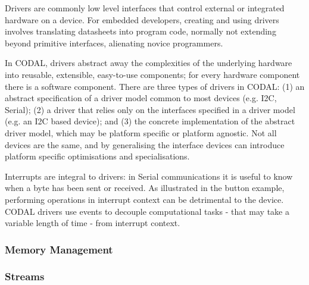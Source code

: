 Drivers are commonly low level interfaces that control external or integrated hardware on a device. For embedded developers, creating and using drivers involves translating datasheets into program code, normally not extending beyond primitive interfaces, alienating novice programmers.

In CODAL, drivers abstract away the complexities of the underlying hardware into reusable, extensible, easy-to-use components; for every hardware component there is a software component. There are three types of drivers in CODAL: (1) an abstract specification of a driver model common to most devices (e.g. I2C, Serial); (2) a driver that relies only on the interfaces specified in a driver model  (e.g. an I2C based device); and (3) the concrete implementation of the abstract driver model, which may be platform specific or platform agnostic. Not all devices are the same, and by generalising the interface devices can introduce platform specific optimisations and specialisations.

Interrupts are integral to drivers: in Serial communications it is useful to know when a byte has been sent or received. As illustrated in the button example, performing operations in interrupt context can be detrimental to the device. CODAL drivers use events to decouple computational tasks - that may take a variable length of time - from interrupt context.


\subsubsection{Memory Management}


\subsubsection{Streams}


